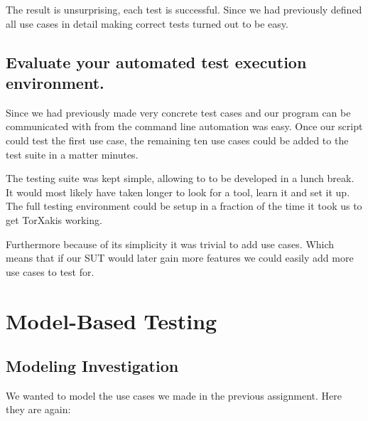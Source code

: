 \documentclass[11pt,a4paper]{article}
\begin{document}
The result is unsurprising, each test is successful. Since we had
previously defined all use cases in detail making correct tests turned out to be easy.

\subsection{Evaluate your automated test execution environment.}

Since we had previously made very concrete test cases and our program
can be communicated with from the command line automation was easy.
Once our script could test the first use case, the remaining ten use
cases could be added to the test suite in a matter minutes.

The testing suite was kept simple, allowing to to be developed in a
lunch break. It would most likely have taken longer to look for a
tool, learn it and set it up. The full testing environment could be
setup in a fraction of the time it took us to get TorXakis working.

Furthermore because of its simplicity it was trivial to add use cases.
Which means that if our SUT would later gain more features we could
easily add more use cases to test for.


\section{Model-Based Testing}

\subsection{Modeling Investigation}
We wanted to model the use cases we made in the previous assignment. Here they are again:
\end{document}
